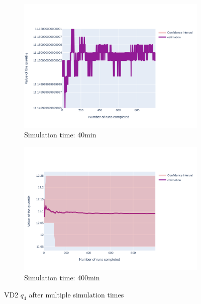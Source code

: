 \documentclass{article}
\begin{document}
\begin{figure}[H]
\begin{subfigure}{.495\textwidth}
    \end{subfigure}
    \begin{subfigure}{.495\textwidth}
        \centering
        \includegraphics[width=\textwidth]{../fig/quantile4/VD2_40mn.png}
        \caption{Simulation time: 40min}
    \end{subfigure}
    \begin{subfigure}{.495\textwidth}
        \centering
        \includegraphics[width=\textwidth]{../fig/quantile4/VD2_400mn.png}
        \caption{Simulation time: 400min}
    \end{subfigure}
    \caption{VD2 $q_4$ after multiple simulation times}
\end{figure}
\end{document}
